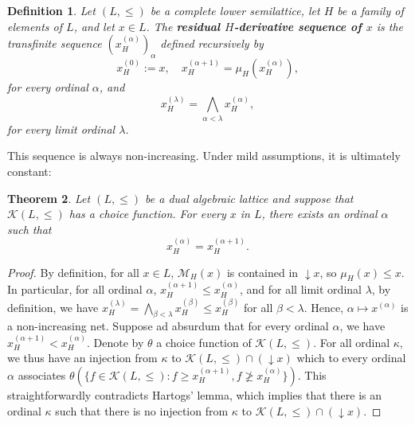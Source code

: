 \documentclass{article}
\newcommand{\blue}{\color{blue}}
\newtheorem{theorem}{Theorem}[section]
\newtheorem{definition}[theorem]{Definition}
\newtheorem{notation}[theorem]{Notation}
\begin{document}
\begin{definition}
Let \((L,\leq)\) be a complete lower semilattice, let \(H\) be a family of elements of \(L\), and let \(x\in L\). The \textbf{residual \(H\)-{derivative sequence} %
of \(x\)} is the transfinite sequence \(\left(x_H^{(\alpha)}\right)_\alpha\)
defined recursively by
\[x_H^{(0)}:=x,\quad x_H^{(\alpha+1)}=\mu_H\!\left(x_H^{(\alpha)}\right),\]
for every ordinal \(\alpha\), and
\[x_H^{(\lambda)}=\bigwedge_{\alpha<\lambda}x_H^{(\alpha)},\]
for every limit ordinal \(\lambda\).
\end{definition}


This sequence is always non-increasing. Under mild assumptions, {it is ultimately constant}: %

\begin{theorem}\label{thm:existence.rank}
Let $(L,\le)$ be a dual algebraic lattice and suppose that $\mathcal{K}(L,\le)$ has a choice function. For every \(x\) in \(L\), there exists an ordinal $\alpha$ such that 
\[x_H^{(\alpha)} = x_H^{(\alpha+1)}.\] %
\end{theorem}

\begin{proof}
By definition, for all $x\in L$, \(\mathcal{M}_H(x)\) is contained in \(\mathop{\downarrow}x\), so \(\mu_H(x) \le x\). In particular, 
for all ordinal $\alpha$, \(x_H^{(\alpha+1)}\leq x_H^{(\alpha)}\), and for all limit ordinal \(\lambda\), by definition, we have \(x_H^{(\lambda)}=\bigwedge_{\beta<\lambda}x_H^{(\beta)}\leq x_H^{(\beta)}\) for all \(\beta<\lambda\). Hence, \(\alpha\mapsto x^{(\alpha)}\) is a non-increasing net. Suppose ad absurdum that for every ordinal \(\alpha\), we have \(x_H^{(\alpha+1)}<x_H^{(\alpha)}\). 
{Denote by $\theta$ a choice function 
of $\mathcal{K}(L,\le)$. For all ordinal $\kappa$, we thus have an injection from $\kappa$ to $\mathcal{K}(L,\le)\cap (\mathop{\downarrow} x)$ which to every ordinal $\alpha$ associates 
$\theta(\{f \in \mathcal{K}(L,\le) : f \ge x_H^{(\alpha+1)}, f \not \ge x_H^{(\alpha)}\})$.}
This straightforwardly contradicts Hartogs' lemma, which implies that there is an ordinal $\kappa$ such that there is no injection from $\kappa$ to $\mathcal{K}(L,\le)\cap (\mathop{\downarrow} x)$.
\end{proof}
\end{document}
